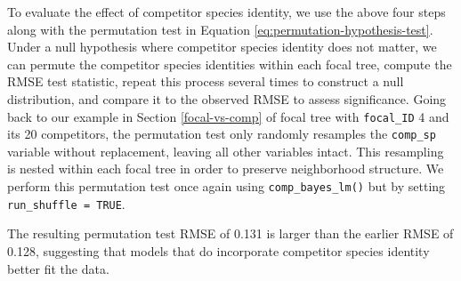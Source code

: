 \documentclass[12pt]{article}
\newenvironment{Shaded}{\begin{snugshade}}{\end{snugshade}}
\newcommand{\CommentTok}[1]{\textcolor[rgb]{0.56,0.35,0.01}{\textit{#1}}}
\newcommand{\DataTypeTok}[1]{\textcolor[rgb]{0.13,0.29,0.53}{#1}}
\newcommand{\KeywordTok}[1]{\textcolor[rgb]{0.13,0.29,0.53}{\textbf{#1}}}
\newcommand{\NormalTok}[1]{#1}
\newcommand{\OperatorTok}[1]{\textcolor[rgb]{0.81,0.36,0.00}{\textbf{#1}}}
\newcommand{\OtherTok}[1]{\textcolor[rgb]{0.56,0.35,0.01}{#1}}
\newcommand{\StringTok}[1]{\textcolor[rgb]{0.31,0.60,0.02}{#1}}
\begin{document}
To evaluate the effect of competitor species identity, we use the above
four steps along with the permutation test in Equation
\ref{eq:permutation-hypothesis-test}. Under a null hypothesis where
competitor species identity does not matter, we can permute the
competitor species identities within each focal tree, compute the RMSE
test statistic, repeat this process several times to construct a null
distribution, and compare it to the observed RMSE to assess
significance. Going back to our example in Section \ref{focal-vs-comp}
of focal tree with \texttt{focal\_ID} 4 and its 20 competitors, the
permutation test only randomly resamples the \texttt{comp\_sp} variable
without replacement, leaving all other variables intact. This resampling
is nested within each focal tree in order to preserve neighborhood
structure. We perform this permutation test once again using
\texttt{comp\_bayes\_lm()} but by setting
\texttt{run\_shuffle\ =\ TRUE}.

\begin{Shaded}
\end{Shaded}

\begin{Shaded}
\end{Shaded}

The resulting permutation test RMSE of 0.131 is larger than the earlier
RMSE of 0.128, suggesting that models that do incorporate competitor
species identity better fit the data.
\end{document}
